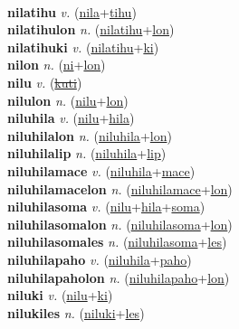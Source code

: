  \label{nilaki} \\
\textbf{nilatihu} \textit{v.} (\hyperref[nila]{nila}+\hyperref[tihu]{tihu})
 \label{nilatihu} \\
\textbf{nilatihulon} \textit{n.} (\hyperref[nilatihu]{nilatihu}+\hyperref[lon]{lon})
 \label{nilatihulon} \\
\textbf{nilatihuki} \textit{v.} (\hyperref[nilatihu]{nilatihu}+\hyperref[ki]{ki})
 \label{nilatihuki} \\
\textbf{nilon} \textit{n.} (\hyperref[ni]{ni}+\hyperref[lon]{lon})
 \label{nilon} \\
\textbf{nilu} \textit{v.} (\hyperref[kuti]{\sout{kuti}})
 \label{nilu} \\
\textbf{nilulon} \textit{n.} (\hyperref[nilu]{nilu}+\hyperref[lon]{lon})
 \label{nilulon} \\
\textbf{niluhila} \textit{v.} (\hyperref[nilu]{nilu}+\hyperref[hila]{hila})
 \label{niluhila} \\
\textbf{niluhilalon} \textit{n.} (\hyperref[niluhila]{niluhila}+\hyperref[lon]{lon})
 \label{niluhilalon} \\
\textbf{niluhilalip} \textit{n.} (\hyperref[niluhila]{niluhila}+\hyperref[lip]{lip})
 \label{niluhilalip} \\
\textbf{niluhilamace} \textit{v.} (\hyperref[niluhila]{niluhila}+\hyperref[mace]{mace})
 \label{niluhilamace} \\
\textbf{niluhilamacelon} \textit{n.} (\hyperref[niluhilamace]{niluhilamace}+\hyperref[lon]{lon})
 \label{niluhilamacelon} \\
\textbf{niluhilasoma} \textit{v.} (\hyperref[nilu]{nilu}+\hyperref[hila]{hila}+\hyperref[soma]{soma})
 \label{niluhilasoma} \\
\textbf{niluhilasomalon} \textit{n.} (\hyperref[niluhilasoma]{niluhilasoma}+\hyperref[lon]{lon})
 \label{niluhilasomalon} \\
\textbf{niluhilasomales} \textit{n.} (\hyperref[niluhilasoma]{niluhilasoma}+\hyperref[les]{les})
 \label{niluhilasomales} \\
\textbf{niluhilapaho} \textit{v.} (\hyperref[niluhila]{niluhila}+\hyperref[paho]{paho})
 \label{niluhilapaho} \\
\textbf{niluhilapaholon} \textit{n.} (\hyperref[niluhilapaho]{niluhilapaho}+\hyperref[lon]{lon})
 \label{niluhilapaholon} \\
\textbf{niluki} \textit{v.} (\hyperref[nilu]{nilu}+\hyperref[ki]{ki})
 \label{niluki} \\
\textbf{nilukiles} \textit{n.} (\hyperref[niluki]{niluki}+\hyperref[les]{les})
